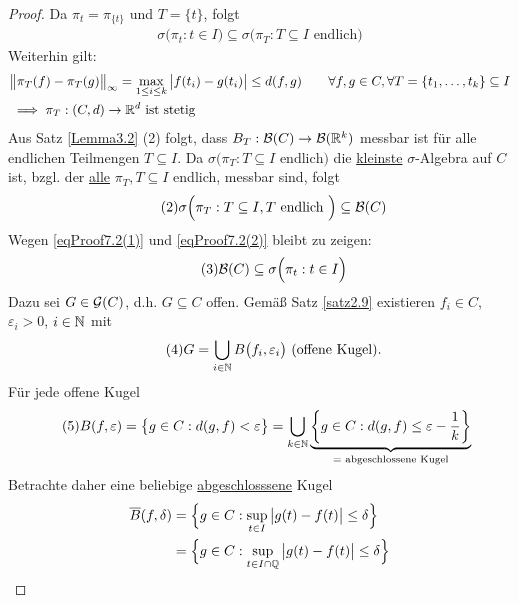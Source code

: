 \begin{proof}
	Da $\pi_t=\pi_{\lbrace t\rbrace}$ und $T=\lbrace t\rbrace$, folgt
	\begin{align}\label{eqProof7.2(1)}\tag{1}
		\sigma\Big(\pi_t:t\in I\Big)
		\subseteq\sigma\Big(\pi_T:T\subseteq I\text{ endlich}\Big)
	\end{align}
	Weiterhin gilt:
	\begin{align*}
		&\big\Vert\pi_T(f)-\pi_T(g)\big\Vert_\infty
		=\max\limits_{1\leq i\leq k}\big|f(t_i)-g(t_i)\big|
		\leq d(f,g)\qquad\forall f,g\in C,\forall T=\lbrace t_1,\ldots,t_k\rbrace\subseteq I\\
		&\implies\pi_T:(C,d)\to\mathbb{R}^d\text{ ist stetig}
	\end{align*}
	Aus Satz \ref{Lemma3.2} (2) folgt, dass $B_T:\mathcal{B}(C)\to\mathcal{B}(\mathbb{R}^k)$ messbar ist für alle endlichen Teilmengen $T\subseteq I$. 
	Da $\sigma\big(\pi_T:T\subseteq I\text{ endlich}\big)$ die \ul{kleinste} $\sigma$-Algebra auf $C$ ist, bzgl. der \ul{alle} $\pi_T,T\subseteq I$ endlich, messbar sind, folgt
	\begin{align}\label{eqProof7.2(2)}\tag{2}
		\sigma\Big(\pi_T:T\subseteq I,T\text{ endlich }\Big)\subseteq\mathcal{B}(C)
	\end{align}
	Wegen \eqref{eqProof7.2(1)} und \eqref{eqProof7.2(2)} bleibt zu zeigen:
	\begin{align}\label{eqProof7.2(3)}\tag{3}
		\mathcal{B}(C)\subseteq\sigma\Big(\pi_t:t\in I\Big)
	\end{align}
	Dazu sei $G\in\mathcal{G}(C)$, d.h. $G\subseteq C$ offen. 
	Gemäß Satz \ref{satz2.9} existieren $f_i\in C$, $\varepsilon_i>0$, $i\in\mathbb{N}$ mit
	\begin{align}\label{eqProof7.2(4)}\tag{4}
		G=\bigcup\limits_{i\in\mathbb{N}}B\big(f_i,\varepsilon_i\big)\text{ (offene Kugel)}.
	\end{align}
	Für jede offene Kugel
	\begin{align}\label{eqProof7.2(5)}\tag{5}
		B(f,\varepsilon)
		&=\big\lbrace g\in C:d(g,f)<\varepsilon\big\rbrace
		=\bigcup\limits_{k\in\mathbb{N}}\underbrace{\left\lbrace g\in C:d(g,f)\leq\varepsilon-\frac{1}{k}\right\rbrace}_{=\text{ abgeschlossene Kugel}}
	\end{align}
	Betrachte daher eine beliebige \ul{abgeschlosssene} Kugel
	\begin{align*}
		\overline{B}(f,\delta)
		&=\Big\lbrace g\in C:\sup\limits_{t\in I}\big|g(t)-f(t)\big|\leq\delta\Big\rbrace\\
		&=\Big\lbrace g\in C:\sup\limits_{t\in I\cap\Q}\big|g(t)-f(t)\big|\leq\delta\Big\rbrace\\

\end{align*}
\end{proof}
